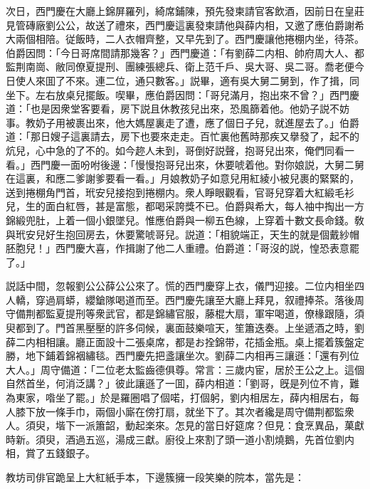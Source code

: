 次日，西門慶在大廳上錦屏羅列，綺席鋪陳，預先發柬請官客飲酒，因前日在皇莊見管磚廠劉公公，故送了禮來，西門慶這裏發柬請他與薛内相，又邀了應伯爵謝希大兩個相陪。従飯時，二人衣帽齊整，又早先到了。西門慶讓他捲棚内坐，待茶。伯爵因問：「今日哥席間請那幾客？」西門慶道：「有劉薛二内相、帥府周大人、都監荆南崗、敝同僚夏提刑、團練張總兵、衛上范千戶、吳大哥、吳二哥。喬老便今日使人來囬了不來。連二位，通只數客。」説畢，適有吳大舅二舅到，作了揖，同坐下。左右放桌兒擺飯。喫畢，應伯爵因問：「哥兒滿月，抱出來不曾？」西門慶道：「也是因衆堂客要看，房下説且休教孩兒出來，恐風篩着他。他奶子説不妨事。教奶子用被裹出來，他大媽屋裏走了遭，應了個日子兒，就進屋去了。」伯爵道：「那日嫂子這裏請去，房下也要來走走。百忙裏他舊時那疾又擧發了，起不的炕兒，心中急的了不的。如今趂人未到，哥倒好説聲，抱哥兒出來，俺們同看一看。」西門慶一面吩咐後邊：「慢慢抱哥兒出來，休要唬着他。對你娘説，大舅二舅在這裏，和應二爹謝爹要看一看。」月娘教奶子如意兒用紅綾小被兒裹的緊緊的，送到捲棚角門首，玳安兒接抱到捲棚内。衆人睜眼觀看，官哥兒穿着大紅緞毛衫兒，生的面白紅唇，甚是富態，都喝采誇獎不已。伯爵與希大，每人袖中掏出一方錦緞兜肚，上着一個小銀墜兒。惟應伯爵與一柳五色線，上穿着十數文長命錢。敎與玳安兒好生抱回房去，休要驚唬哥兒。説道：「相貌端正，天生的就是個戴紗帽胚胞兒！」西門慶大喜，作揖謝了他二人重禮。伯爵道：「哥沒的説，惶恐表意罷了。」

説話中間，忽報劉公公薛公公來了。慌的西門慶穿上衣，儀門迎接。二位内相坐四人轎，穿過肩蟒，纓鎗隊喝道而至。西門慶先讓至大廳上拜見，叙禮捧茶。落後周守備荆都監夏提刑等衆武官，都是錦繡官服，藤棍大扇，軍牢喝道，僚椽跟隨，須臾都到了。門首黑壓壓的許多伺候，裏面鼓樂喧天，笙簫迭奏。上坐遞酒之時，劉薛二内相相讓。廳正面設十二張桌席，都是お拴錦带，花插金瓶。桌上擺着簇盤定勝，地下鋪着錦裀繡毯。西門慶先把盞讓坐次。劉薛二内相再三讓遜：「還有列位大人。」周守備道：「二位老太監齒德俱尊。常言：三歲内宦，居於王公之上。這個自然首坐，何消泛講？」彼此讓遜了一囬，薛内相道：「劉哥，旣是列位不肯，難為東家，喒坐了罷。」於是羅圈唱了個喏，打個躬，劉内相居左，薛内相居右，每人膝下放一條手巾，兩個小廝在傍打扇，就坐下了。其次者纔是周守備荆都監衆人。須臾，堦下一派簫韶，動起楽來。怎見的當日好筵席？但見：食烹異品，菓獻時新。須臾，酒過五巡，湯成三獻。廚役上來割了頭一道小割燒鵝，先首位劉内相，賞了五錢銀子。

教坊司俳官跪呈上大紅紙手本，下邊簇擁一段笑樂的院本，當先是：

